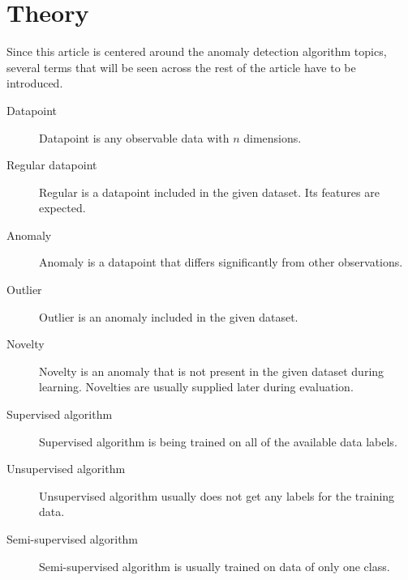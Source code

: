 
\section{Theory}
\label{sec:theory}
Since this article is centered around the anomaly detection algorithm topics, several terms that will be seen across the rest of the article have to be introduced.
\begin{description}
    \item[Datapoint] Datapoint is any observable data with \(n\) dimensions.
    \item[Regular datapoint] Regular is a datapoint included in the given dataset. Its features are expected.
    \item[Anomaly] Anomaly is a datapoint that differs significantly from other observations.
    \item[Outlier] Outlier is an anomaly included in the given dataset.
    \item[Novelty] Novelty is an anomaly that is not present in the given dataset during
learning. Novelties are usually supplied later during evaluation.
    \item[Supervised algorithm] Supervised algorithm is being trained on all of the available data labels.
    \item[Unsupervised algorithm] Unsupervised algorithm usually does not get any labels for the training data.
    \item[Semi-supervised algorithm] Semi-supervised algorithm is usually trained on data of only one class.
\end{description}